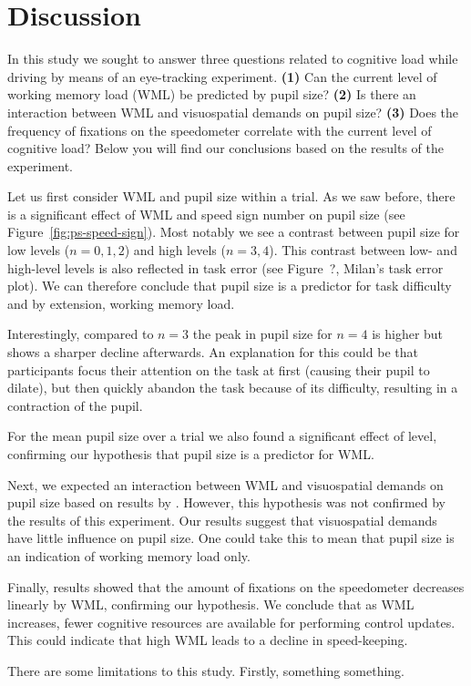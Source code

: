 
\section{Discussion}\label{sec:discussion}
In this study we sought to answer three questions related to cognitive load while driving by means of an eye-tracking experiment.
\textbf{(1)} Can the current level of working memory load (WML) be predicted by pupil size?
\textbf{(2)} Is there an interaction between WML and visuospatial demands on pupil size?
\textbf{(3)} Does the frequency of fixations on the speedometer correlate with the current level of cognitive load?
Below you will find our conclusions based on the results of the experiment.

Let us first consider WML and pupil size within a trial.
As we saw before, there is a significant effect of WML and speed sign number on pupil size (see Figure~\ref{fig:ps-speed-sign}).
Most notably we see a contrast between pupil size for low \nback levels (\(n = 0,1,2\)) and high \nback levels (\(n = 3,4\)). 
This contrast between low- and high-level \nback levels is also reflected in task error (see Figure~?, Milan's task error plot).
We can therefore conclude that pupil size is a predictor for task difficulty and by extension, working memory load. 

Interestingly, compared to \(n = 3\) the peak in pupil size for \(n = 4\) is higher but shows a sharper decline afterwards.
An explanation for this could be that participants focus their attention on the task at first (causing their pupil to dilate), but then quickly abandon the task because of its difficulty, resulting in a contraction of the pupil.

For the mean pupil size over a trial we also found a significant effect of \nback level, confirming our hypothesis that pupil size is a predictor for WML.\@

Next, we expected an interaction between WML and visuospatial demands on pupil size based on results by \citet{Scheunemann2019}.
However, this hypothesis was not confirmed by the results of this experiment. 
Our results suggest that visuospatial demands have little influence on pupil size.
One could take this to mean that pupil size is an indication of working memory load only.

Finally, results showed that the amount of fixations on the speedometer decreases linearly by WML, confirming our hypothesis.
We conclude that as WML increases, fewer cognitive resources are available for performing control updates.
This could indicate that high WML leads to a decline in speed-keeping.

There are some limitations to this study. 
Firstly, something something.